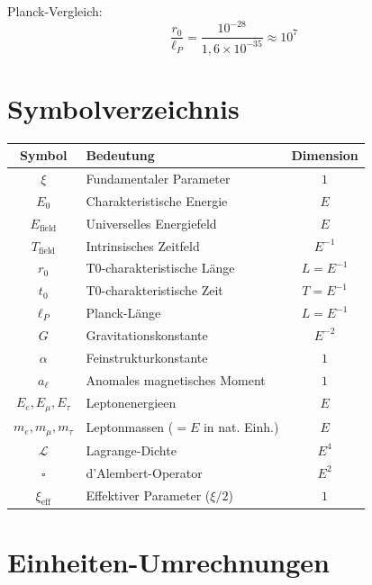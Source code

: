 	Planck-Vergleich:
	\begin{equation}
		\frac{r_0}{\ell_P} = \frac{10^{-28}}{1{,}6 \times 10^{-35}} \approx 10^7
	\end{equation}
	
	
	\appendix
	
	\section{Symbolverzeichnis}
	
	\begin{longtable}{|c|l|c|}
		\hline
		\textbf{Symbol} & \textbf{Bedeutung} & \textbf{Dimension} \\
		\hline
		$\xi$ & Fundamentaler Parameter & $1$ \\
		$E_0$ & Charakteristische Energie & $E$ \\
		$E_{\text{field}}$ & Universelles Energiefeld & $E$ \\
		$T_{\text{field}}$ & Intrinsisches Zeitfeld & $E^{-1}$ \\
		$r_0$ & T0-charakteristische Länge & $L = E^{-1}$ \\
		$t_0$ & T0-charakteristische Zeit & $T = E^{-1}$ \\
		$\ell_P$ & Planck-Länge & $L = E^{-1}$ \\
		$G$ & Gravitationskonstante & $E^{-2}$ \\
		$\alpha$ & Feinstrukturkonstante & $1$ \\
		$a_\ell$ & Anomales magnetisches Moment & $1$ \\
		$E_e, E_\mu, E_\tau$ & Leptonenergieen & $E$ \\
		$m_e, m_\mu, m_\tau$ & Leptonmassen ($= E$ in nat. Einh.) & $E$ \\
		$\mathcal{L}$ & Lagrange-Dichte & $E^4$ \\
		$\square$ & d'Alembert-Operator & $E^2$ \\
		$\xi_{\text{eff}}$ & Effektiver Parameter ($\xi/2$) & $1$ \\
		\hline
	\end{longtable}
	
	\section{Einheiten-Umrechnungen}
	
